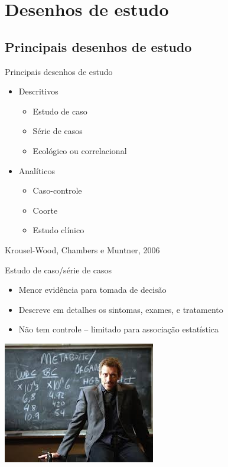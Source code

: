 \documentclass{beamer}
\begin{document}
\section{Desenhos de estudo}

\subsection{Principais desenhos de estudo}

\begin{frame}{Principais desenhos de estudo}
  \begin{itemize}
  \item Descritivos
    \begin{itemize}
    \item Estudo de caso
    \item Série de casos
    \item Ecológico ou correlacional
    \end{itemize}
  \item Analíticos
    \begin{itemize}
    \item Caso-controle
    \item Coorte
    \item Estudo clínico
    \end{itemize}
  \end{itemize}

  \vfill
  \tiny
  \hfill Krousel-Wood, Chambers e Muntner, 2006
\end{frame}

\begin{frame}{Estudo de caso/série de casos}
  \begin{itemize}
    \small
  \item Menor evidência para tomada de decisão
    \bigskip
  \item Descreve em detalhes os sintomas, exames, e tratamento
    \bigskip
  \item Não tem controle -- limitado para associação estatística
  \end{itemize}
  \begin{center}
    \bigskip
    \bigskip
    \includegraphics[height=.4\textheight]{Metodos/house}
  \end{center}
\end{frame}
\end{document}
